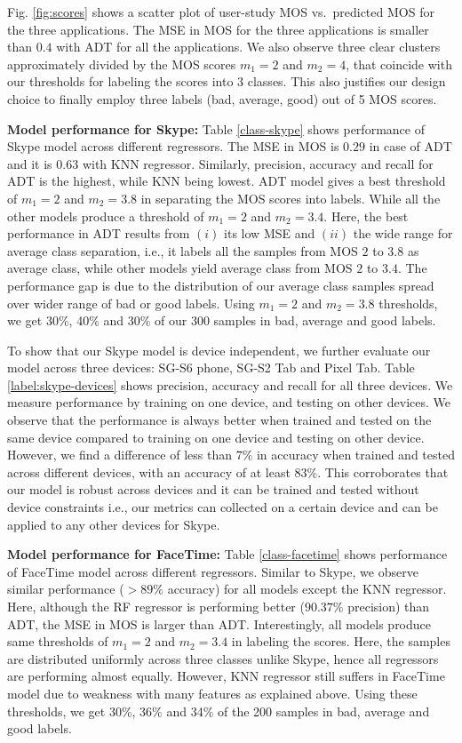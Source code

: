 Fig. \ref{fig:scores} shows a scatter plot of user-study MOS vs.~predicted MOS for the three applications. The MSE in MOS for the three applications is smaller than $0.4$ with ADT for all the applications. We also observe three clear clusters approximately divided by the MOS scores $m_1=2$ and $m_2=4$, that coincide with our thresholds for labeling the scores into 3 classes. This also justifies our design choice to finally employ three labels (bad, average, good) out of 5 MOS scores.

\noindent\textbf{Model performance for Skype:} 
Table \ref{class-skype} shows performance of Skype model across different regressors. 
The MSE in MOS is $0.29$ in case of ADT and it is $0.63$ with KNN regressor. 
Similarly, precision, accuracy and recall for ADT is the highest, while KNN being lowest.
ADT model gives a best threshold of $m_1=2$ and $m_2=3.8$ in separating the MOS scores into labels. While all the other models produce a threshold of $m_1=2$ and $m_2=3.4$.
Here, the best performance in ADT results from $(i)$ its low MSE and $(ii)$ the wide range for average class separation, i.e., it labels all the samples from MOS $2$ to $3.8$ as average class, while other models yield average class from MOS $2$ to $3.4$.
The performance gap is due to the distribution of our average class samples spread over wider range of bad or good labels. 
Using $m_1=2$ and $m_2=3.8$ thresholds, we get 30\%, 40\% and 30\% of our 300 samples in bad, average and good labels.

To show that our Skype model is device independent, we further evaluate our model across three devices: SG-S6 phone, SG-S2 Tab and Pixel Tab. Table \ref{label:skype-devices} shows precision, accuracy and recall for all three devices. We measure performance by training on one device, and testing on other devices. We observe that the performance is always better when trained and tested on the same device compared to training on one device and testing on other device. However, we find a difference of less than $7\%$ in accuracy when trained and tested across different devices, with an accuracy of at least 83\%. This corroborates that our model is robust across devices and it can be trained and tested without device constraints i.e., our metrics can collected on a certain device and can be applied to any other devices for Skype.

\noindent\textbf{Model performance for FaceTime:} 
Table \ref{class-facetime} shows performance of FaceTime model across different regressors.
Similar to Skype, we observe similar performance ($>89\%$ accuracy) for all models except the KNN regressor. 
Here, although the RF regressor is performing better ($90.37\%$ precision) than ADT, the MSE in MOS is larger than ADT.
Interestingly, all models produce same thresholds of $m_1=2$ and $m_2=3.4$ in labeling the scores.
Here, the samples are distributed uniformly across three classes unlike Skype, hence all regressors are performing almost equally. However, KNN regressor still suffers in FaceTime model due to weakness with many features as explained above. 
Using these thresholds, we get 30\%, 36\% and 34\% of the 200 samples in bad, average and good labels.

